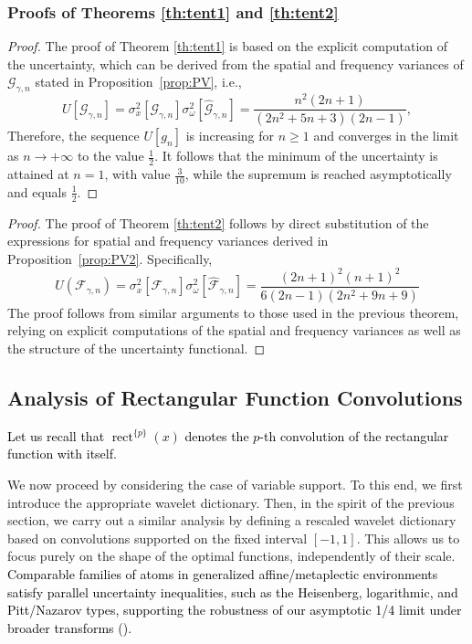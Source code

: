 \documentclass[preprint,hidelinks,authoryear]{elsarticle}
\theoremstyle{plain}
\theoremstyle{definition}
\theoremstyle{remark}
\begin{document}
\subsubsection{Proofs of Theorems \ref{th:tent1} and \ref{th:tent2}}
\begin{proof}
The proof of Theorem \ref{th:tent1} is based on the explicit computation of the uncertainty, which can be derived from the spatial and frequency variances of $ \mathcal{G}_{\gamma,n} $ stated in Proposition~\ref{prop:PV}, i.e.,
$$U[\mathcal{G}_{\gamma,n}]= \sigma_x^2[\mathcal{G}_{\gamma,n}] \sigma_\omega^2[\hat{\mathcal{G}}_{\gamma,n}] = \frac{n^2 (2n + 1)}{(2n^2 + 5n + 3) (2n - 1)}  ,
$$
Therefore, the sequence $ U[g_n] $ is increasing for $ n \geq 1 $ and converges in the limit as $ n \to +\infty $ to the value $ \frac{1}{2} $. It follows that the minimum of the uncertainty is attained at $ n = 1 $, with value $ \frac{3}{10} $, while the supremum is reached asymptotically and equals $ \frac{1}{2} $.
\end{proof}


\begin{proof}
The proof of Theorem \ref{th:tent2} follows by direct substitution of the expressions for spatial and frequency variances derived in Proposition~\ref{prop:PV2}. Specifically,
\begin{equation} 
U(\mathcal{F}_{\gamma,n})=\sigma_x^2[\mathcal{F}_{\gamma,n}]\sigma_\omega^2[\hat{\mathcal{F}}_{\gamma,n}]= \frac{(2n+1)^2(n+1)^2}{6(2n-1) \left(2 n^2+9 n+9\right)}
\end{equation}
The proof follows from similar arguments to those used in the previous theorem, relying on explicit computations of the spatial and frequency variances as well as the structure of the uncertainty functional.
\end{proof}











\subsection{Analysis of Rectangular Function Convolutions}
\textcolor{black}{Let us recall that $ \operatorname{rect}^{\{p\}}(x) $ denotes the $ p $-th convolution of the rectangular function with itself.}

We now proceed by considering the case of variable support. To this end, we first introduce the appropriate wavelet dictionary. Then, in the spirit of the previous section, we carry out a similar analysis by defining a rescaled wavelet dictionary based on convolutions supported on the fixed interval $ [-1, 1] $. This allows us to focus purely on the shape of the optimal functions, independently of their scale. \textcolor{black}{Comparable families of atoms in generalized affine/metaplectic environments satisfy parallel uncertainty inequalities, such as the Heisenberg, logarithmic, and Pitt/Nazarov types, supporting the robustness of our asymptotic 1/4 limit under broader transforms (\cite{dar2024n,dades2025new}).}
\end{document}
